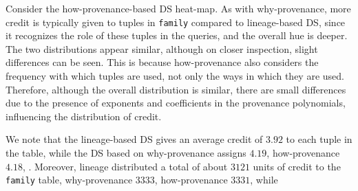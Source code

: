 Consider the how-provenance-based DS heat-map. %
As with why-provenance, more credit is typically given to tuples in \texttt{family} compared to lineage-based DS, since it recognizes the role of these tuples in the queries, and the overall hue is deeper.  
The two distributions appear similar, although on closer inspection, slight differences can be seen. 
This is because how-provenance also considers the frequency with which tuples are used, not only the ways in which they are used. Therefore, although the overall distribution is similar, there are small differences due to the presence of exponents and coefficients in the provenance polynomials, influencing the distribution of credit. 



We note that the lineage-based DS gives an average credit of $3.92$ to each tuple in the table, while the DS based on why-provenance assigns $4.19$, how-provenance $4.18$, . 
Moreover, lineage distributed a total of about $3121$ units of credit to the \texttt{family} table, why-provenance $3333$, how-provenance $3331$, while  


